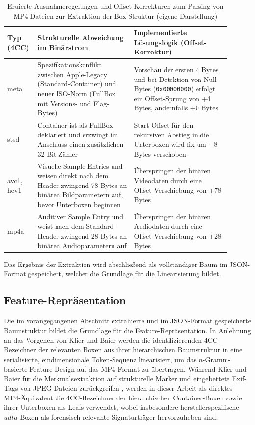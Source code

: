 \begin{table}[h]
    \centering
    \begin{tabular}{>{\raggedright\arraybackslash}p{0.1\linewidth}p{0.4\linewidth}p{0.4\linewidth}}\toprule
         \textbf{Typ (4CC)} & \textbf{Strukturelle Abweichung im Binärstrom} & \textbf{Implementierte Lösungslogik (Offset-Korrektur)} \\\midrule
         meta & Spezifikationskonflikt zwischen Apple-Legacy (Standard-Container) und neuer ISO-Norm (FullBox mit Versions- und Flag-Bytes) & Vorschau der ersten 4 Bytes und bei Detektion von Null-Bytes (\texttt{0x00000000}) erfolgt ein Offset-Sprung von +4 Bytes, andernfalls +0 Bytes \\\midrule
         stsd & Container ist als FullBox deklariert und erzwingt im Anschluss einen zusätzlichen 32-Bit-Zähler & Start-Offset für den rekursiven Abstieg in die Unterboxen wird fix um +8 Bytes verschoben \\\midrule
         avc1, hev1 & Visuelle Sample Entries und weisen direkt nach dem Header zwingend 78 Bytes an binären Bildparametern auf, bevor Unterboxen beginnen & Überspringen der binären Videodaten durch eine Offset-Verschiebung von +78 Bytes\\\midrule
         mp4a & Auditiver Sample Entry und weist nach dem Standard-Header zwingend 28 Bytes an binären Audioparametern auf & Überspringen der binären Audiodaten durch eine Offset-Verschiebung von +28 Bytes\\\bottomrule
    \end{tabular}
\caption{Eruierte Ausnahmeregelungen und Offset-Korrekturen zum Parsing von MP4-Dateien zur Extraktion der Box-Struktur (eigene Darstellung)}
\label{tab:ausnahmeboxen}
\end{table}

Das Ergebnis der Extraktion wird abschließend als vollständiger Baum im JSON-Format gespeichert, welcher die Grundlage für die Linearisierung bildet.


\subsection{Feature-Repräsentation}
\label{sec:featurerep}

Die im vorangegangenen Abschnitt extrahierte und im JSON-Format gespeicherte Baumstruktur bildet die Grundlage für die Feature-Repräsentation. In Anlehnung an das Vorgehen von Klier und Baier \cite[Kap. 3]{klier_media_2025} werden die identifizierenden 4CC-Bezeichner der relevanten Boxen aus ihrer hierarchischen Baumstruktur in eine serialisierte, eindimensionale Token-Sequenz linearisiert, um das \(n\)-Gramm-basierte Feature-Design auf das MP4-Format zu übertragen. Während Klier und Baier für die Merkmalsextraktion auf strukturelle Marker und eingebettete Exif-Tags von JPEG-Dateien zurückgreifen \cite[Kap. 3.1]{klier_media_2025}, werden in dieser Arbeit als direktes MP4-Äquivalent die 4CC-Bezeichner der hierarchischen Container-Boxen sowie ihrer Unterboxen als Leafs verwendet, wobei insbesondere herstellerspezifische \(udta\)-Boxen als forensisch relevante Signaturträger hervorzuheben sind.


